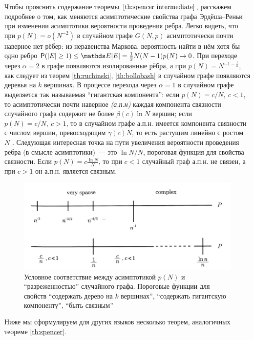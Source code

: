 Чтобы прояснить содержание теоремы $\ref{th:spencer intermediate}$, расскажем подробнее о том, как меняются  асимптотические свойства графа Эрдёша--Реньи при изменении асимптотики вероятности проведения ребра.
Легко видеть, что при $p(N) = o(N^{-2})$ в случайном графе $G(N,p)$ асимптотически почти наверное нет рёбер: из неравенства Маркова, вероятность найти в нём хотя бы одно ребро $\P(|E| \geq 1) \leq \E |E| = \frac{1}{2} N(N-1)p(N) \rightarrow 0$.
При переходе через $\alpha = 2$ в графе появляются изолированные рёбра, а при $p(N) = N^{-1 - \frac{1}{k}}$, как следует из теорем \ref{th:ruchinski}, \ref{th:bollobash} в случайном графе появляются деревья на $k$ вершинах.
В процессе перехода через $\alpha = 1$ в случайном графе выделяется так называемая ``гигантская компонента'': если $p(N)=c/N,~ c < 1$, то асимптотически почти наверное \textit{(а.п.н)} каждая компонента связности случайного графа содержит не более $\beta (c) \ln{N} $ вершин;
если $p(N)=c/N,~ c > 1$, то в случайном графе а.п.н. имеется компонента связности с числом вершин, превосходящим $\gamma(c)N$, то есть растущим линейно с ростом $N$\cite{erdos1959random} \cite{erdos1960evolution} \cite{raigor2010models}.
Следующая интересная точка на пути увеличения вероятности проведения ребра (в смысле асимптотики)~--- это $\ln{N}/N$, пороговая функция для свойства связности.
Если $p(N) = c \frac{\ln{N}}{N}$, то при $c < 1$ случайный граф а.п.н. не связен, а при $c > 1$ он а.п.н. является связным\cite{raigor2010models}.
\begin{figure}
  \centering
  \includegraphics[scale=0.5]{picrel/density.png}
  \caption{Условное соответствие между асимптотикой $p(N)$ и ``разреженностью'' случайного графа. Пороговые функции для свойств ``содержать дерево на $k$ вершинах'', ``содержать гигантскую компоненту'', ``быть связным''}
  \label{fig:density}
\end{figure}

Ниже мы сформулируем для других языков несколько теорем, аналогичных теореме \ref{th:spencer}.

